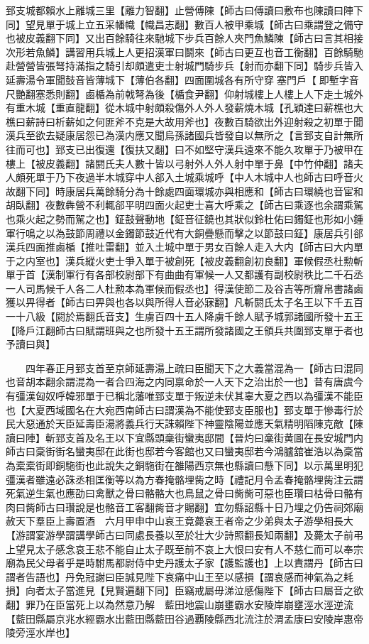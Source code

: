 郅支城都賴水上離城三里【離力智翻】止營傅陳【師古曰傅讀曰敷布也陳讀曰陣下同】望見單于城上立五采幡幟【幟昌志翻】數百人被甲乘城【師古曰乘謂登之備守也被皮義翻下同】又出百餘騎往來馳城下步兵百餘人夾門魚鱗陳【師古曰言其相接次形若魚鱗】講習用兵城上人更招漢軍曰鬬來【師古曰更互也音工衡翻】百餘騎馳赴營營皆張弩持滿指之騎引却頗遣吏士射城門騎步兵【射而亦翻下同】騎步兵皆入延壽湯令軍聞鼓音皆薄城下【薄伯各翻】四面圍城各有所守穿塞門戶【即塹字音尺艷翻塞悉則翻】鹵楯為前戟弩為後【楯食尹翻】仰射城樓上人樓上人下走土城外有重木城【重直龍翻】從木城中射頗殺傷外人外人發薪燒木城【孔穎達曰薪樵也大樵曰薪詩曰析薪如之何匪斧不克是大故用斧也】夜數百騎欲出外迎射殺之初單于聞漢兵至欲去疑康居怨已為漢内應又聞烏孫諸國兵皆發自以無所之【言郅支自計無所往而可也】郅支已出復還【復扶又翻】曰不如堅守漢兵遠來不能久攻單于乃被甲在樓上【被皮義翻】諸閼氏夫人數十皆以弓射外人外人射中單于鼻【中竹仲翻】諸夫人頗死單于乃下夜過半木城穿中人郤入土城乘城呼【中人木城中人也師古曰呼音火故翻下同】時康居兵萬餘騎分為十餘處四面環城亦與相應和【師古曰環繞也音宦和胡臥翻】夜數犇營不利輒郤平明四面火起吏士喜大呼乘之【師古曰乘逐也余謂乘駕也乘火起之勢而駕之也】鉦鼓聲動地【鉦音征鐃也其狀似鈴杜佑曰鐲鉦也形如小鍾軍行鳴之以為鼓節周禮以金鐲節鼓近代有大銅疊懸而擊之以節鼓曰鉦】康居兵引郤漢兵四面推鹵楯【推吐雷翻】並入土城中單于男女百餘人走入大内【師古曰大内單于之内室也】漢兵縱火吏士爭入單于被創死【被皮義翻創初良翻】軍候假丞杜勲斬單于首【漢制軍行有各部校尉部下有曲曲有軍候一人又都護有副校尉秩比二千石丞一人司馬候千人各二人杜勲本為軍候而假丞也】得漢使節二及谷吉等所齎帛書諸鹵獲以畀得者【師古曰畀與也各以與所得人音必寐翻】凡斬閼氏太子名王以下千五百一十八級【閼於焉翻氏音支】生虜百四十五人降虜千餘人賦予城郭諸國所發十五王【降戶江翻師古曰賦謂班與之也所發十五王謂所發諸國之王領兵共圍郅支單于者也予讀曰與】

　　四年春正月郅支首至京師延壽湯上疏曰臣聞天下之大義當混為一【師古曰混同也音胡本翻余謂混為一者合四海之内同禀命於一人天下之治出於一也】昔有唐虞今有彊漢匈奴呼韓邪單于已稱北藩唯郅支單于叛逆未伏其辜大夏之西以為彊漢不能臣也【大夏西域國名在大宛西南師古曰謂漢為不能使郅支臣服也】郅支單于慘毒行於民大惡通於天臣延壽臣湯將義兵行天誅賴陛下神靈陰陽並應天氣精明䧟陳克敵【陳讀曰陣】斬郅支首及名王以下宜縣頭稾街蠻夷邸間【晉灼曰稾街黄圖在長安城門内師古曰稾街街名蠻夷邸在此街也邸若今客館也又曰蠻夷邸若今鴻臚舘崔浩以為稾當為槖槖街即銅駞街也此說失之銅駞街在雒陽西京無也縣讀曰懸下同】以示萬里明犯彊漢者雖遠必誅丞相匡衡等以為方春掩骼埋胔之時【禮記月令孟春掩骼埋胔注云謂死氣逆生氣也應劭曰禽獸之骨曰骼骼大也鳥鼠之骨曰胔胔可惡也臣瓚曰枯骨曰骼有肉曰胔師古曰瓚說是也骼音工客翻胔音才賜翻】宜勿縣詔縣十日乃埋之仍告祠郊廟赦天下羣臣上壽置酒　六月甲申中山哀王竟薨哀王者帝之少弟與太子游學相長大【游謂宴游學謂講學師古曰同處長養以至於壮大少詩照翻長知兩翻】及薨太子前弔上望見太子感念哀王悲不能自止太子既至前不哀上大恨曰安有人不慈仁而可以奉宗廟為民父母者乎是時駙馬都尉侍中史丹護太子家【護監護也】上以責謂丹【師古曰謂者告語也】丹免冠謝曰臣誠見陛下哀痛中山王至以感損【謂哀感而神氣為之耗損】向者太子當進見【見賢遍翻下同】臣竊戒屬毋涕泣感傷陛下【師古曰屬音之欲翻】罪乃在臣當死上以為然意乃解　藍田地震山崩壅霸水安陵岸崩壅涇水涇逆流【藍田縣屬京兆水經霸水出藍田縣藍田谷過覇陵縣西北流注於渭孟康曰安陵岸惠帝陵旁涇水岸也】

